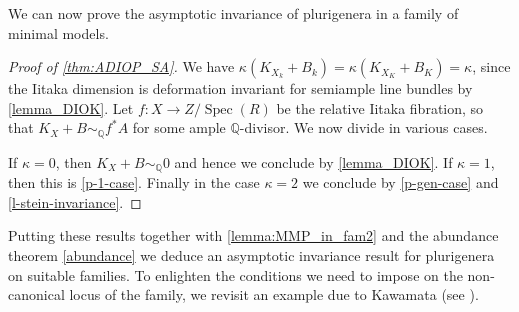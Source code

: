 \documentclass[a4paper,12pt]{book}
\DeclareMathOperator{\Spec}{Spec}
\newcommand{\bQ}{\mathbb{Q}}
\begin{document}
	
	We can now prove the asymptotic invariance of plurigenera in a family of minimal models.
	
	\begin{proof}[Proof of \autoref{thm:ADIOP_SA}]
		We have $\kappa(K_{X_k}+B_k)=\kappa(K_{X_K}+B_K)=\kappa$, since the Iitaka dimension is deformation invariant for semiample line bundles by \autoref{lemma_DIOK}. Let $f \colon X\to Z/\Spec (R)$ be the relative Iitaka fibration, so that $K_X+B\sim_{\bQ}f^\ast A$ for some ample $\bQ$-divisor. 
		We now divide in various cases.
		
		If $\kappa=0$, then $K_X+B\sim_{\bQ}0$ and hence we conclude by \autoref{lemma_DIOK}.
		If $\kappa=1$, then this is \autoref{p-1-case}. 
		Finally in the case $\kappa=2$ we conclude by \autoref{p-gen-case} and \autoref{l-stein-invariance}. 	
	\end{proof}
	
	
	Putting these results together with \autoref{lemma:MMP_in_fam2} and the abundance theorem \autoref{abundance} we deduce an asymptotic invariance result for plurigenera on suitable families. To enlighten the conditions we need to impose on the non-canonical locus of the family, we revisit an example due to Kawamata (see \cite[Example 4.3]{Kaw99}).
	
\end{document}
